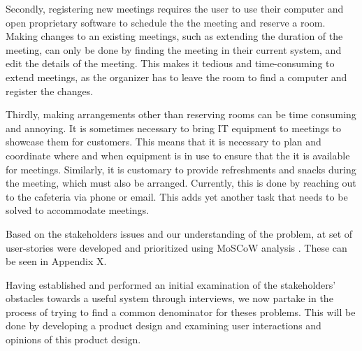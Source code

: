 Secondly, registering new meetings requires the user to use their computer and open proprietary software to schedule the the meeting and reserve a room.
Making changes to an existing meetings, such as extending the duration of the meeting, can only be done by finding the meeting in their current system, and edit the details of the meeting.
This makes it tedious and time-consuming to extend meetings, as the organizer has to leave the room to find a computer and register the changes.

Thirdly, making arrangements other than reserving rooms can be time consuming and annoying. 
It is sometimes necessary to bring IT equipment to meetings to showcase them for customers.
This means that it is necessary to plan and coordinate where and when equipment is in use to ensure that the it is available for meetings. 
Similarly, it is customary to provide refreshments and snacks during the meeting, which must also be arranged. 
Currently, this is done by reaching out to the cafeteria via phone or email.
This adds yet another task that needs to be solved to accommodate meetings.

Based on the stakeholders issues and our understanding of the problem, at set of user-stories were developed and prioritized using MoSCoW analysis \cite{DEBbook}.
These can be seen in Appendix X.

Having established and performed an initial examination of the stakeholders' obstacles towards a useful system through interviews, we now partake in the process of trying to find a common denominator for theses problems.
This will be done by developing a product design and examining user interactions and opinions of this product design.